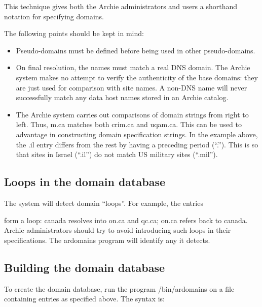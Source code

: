 This technique gives both the Archie administrators and users a shorthand notation for specifying domains.

The following points should be kept in mind:

\begin{itemize}
\item
Pseudo-domains must be defined before being used in other pseudo-domains.

\item
On final resolution, the names must match a real DNS domain. The Archie system
makes no attempt to verify the authenticity of the base domains: they are just
used for comparison with site names. A non-DNS name will never successfully
match any data host names stored in an Archie catalog.

\item
The Archie system carries out comparisons of domain strings from right to
left. Thus, m.ca matches both crim.ca and uqam.ca. This can be used to
advantage in constructing domain specification strings. In the example above,
the .il entry differs from the rest by having a preceding period (``.''). This
is so that sites in Israel (``.il'') do not match US military sites (``.mil'').
\end{itemize}


\subsection{Loops in the domain database}

The system will detect domain ``loops''. For example, the entries





form a loop: canada resolves into on.ca and qc.ca; on.ca refers back to canada. Archie administrators should try to avoid introducing such loops in their specifications. The ardomains program will identify any it detects.

\subsection{Building the domain database}

To create the domain database, run the program \archie/bin/ardomains on a file containing entries as specified above. The syntax is:


